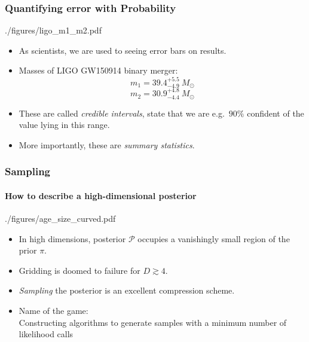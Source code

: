 \documentclass[%
]{beamer}
\newcommand{\posterior}{\mathcal{P}}
\newcommand{\prior}{\pi}
\begin{document}
\begin{frame}
    \frametitle{Quantifying error with Probability}

    \begin{figright}[0.5]{./figures/ligo_m1_m2.pdf}
        \begin{itemize}
            \item As scientists, we are used to seeing error bars on results.
            \item Masses of LIGO GW150914 binary merger: 
            \[m_1 = 39.4^{+5.5}_{-4.9}\:M_\odot\]
            \[ m_2 = 30.9^{+4.8}_{-4.4}\:M_\odot \]
            \item These are called {\em credible intervals}, state that we are e.g.\ $90\%$ confident of the value lying in this range.
            \item More importantly, these are {\em summary statistics}.
        \end{itemize}
    \end{figright}
\end{frame}


\begin{frame}
    \frametitle{Sampling}
    \framesubtitle{How to describe a high-dimensional posterior}

    \begin{figright}[0.4]{./figures/age_size_curved.pdf}
		\begin{itemize}
          \item In high dimensions, posterior $\posterior$ occupies a vanishingly small region of the prior $\prior$.
          \item Gridding is doomed to failure for $D\gtrsim4$.
          \item {\em Sampling\/} the posterior is an excellent compression scheme.
          \item Name of the game: \\ Constructing algorithms to generate samples with a minimum number of likelihood calls
		\end{itemize}
	\end{figright}
\end{frame}
\end{document}
